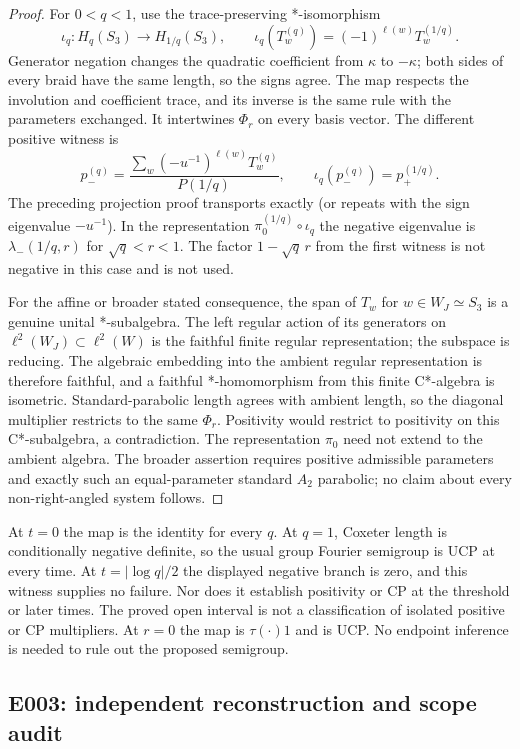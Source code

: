 \begin{proof}
For $0<q<1$, use the trace-preserving *-isomorphism
\[
 \iota_q:H_q(S_3)\longrightarrow H_{1/q}(S_3),\qquad
 \iota_q(T_w^{(q)})=(-1)^{\ell(w)}T_w^{(1/q)}.
\]
Generator negation changes the quadratic coefficient from $\kappa$ to
$-\kappa$; both sides of every braid have the same length, so the signs
agree. The map respects the involution and coefficient trace, and its
inverse is the same rule with the parameters exchanged. It intertwines
$\Phi_r$ on every basis vector. The different positive witness is
\[
 p_-^{(q)}=\frac{\sum_w(-u^{-1})^{\ell(w)}T_w^{(q)}}{P(1/q)},
 \qquad \iota_q(p_-^{(q)})=p_+^{(1/q)}.
\]
The preceding projection proof transports exactly (or repeats with
the sign eigenvalue $-u^{-1}$). In the representation
$\pi_0^{(1/q)}\circ\iota_q$ the negative eigenvalue is
$\lambda_-(1/q,r)$ for $\sqrt q<r<1$. The factor $1-\sqrt q\,r$
from the first witness is not negative in this case and is not used.

For the affine or broader stated consequence, the span of $T_w$ for
$w\in W_J\simeq S_3$ is a genuine unital *-subalgebra. The left regular
action of its generators on $\ell^2(W_J)\subset\ell^2(W)$ is the faithful
finite regular representation; the subspace is reducing. The algebraic
embedding into the ambient regular representation is therefore faithful,
and a faithful *-homomorphism from this finite C*-algebra is isometric.
Standard-parabolic length agrees with ambient length, so the diagonal
multiplier restricts to the same $\Phi_r$. Positivity would restrict to
positivity on this C*-subalgebra, a contradiction. The representation
$\pi_0$ need not extend to the ambient algebra. The broader assertion
requires positive admissible parameters and exactly such an equal-parameter
standard $A_2$ parabolic; no claim about every non-right-angled system follows.
\end{proof}

At $t=0$ the map is the identity for every $q$. At $q=1$, Coxeter length
is conditionally negative definite, so the usual group Fourier semigroup
is UCP at every time. At $t=|\log q|/2$ the displayed negative branch is
zero, and this witness supplies no failure. Nor does it establish positivity
or CP at the threshold or later times. The proved open interval is not a
classification of isolated positive or CP multipliers. At $r=0$ the map
is $\tau(\cdot)1$ and is UCP. No endpoint inference is needed to rule out
the proposed semigroup.

\subsection{E003: independent reconstruction and scope audit}
